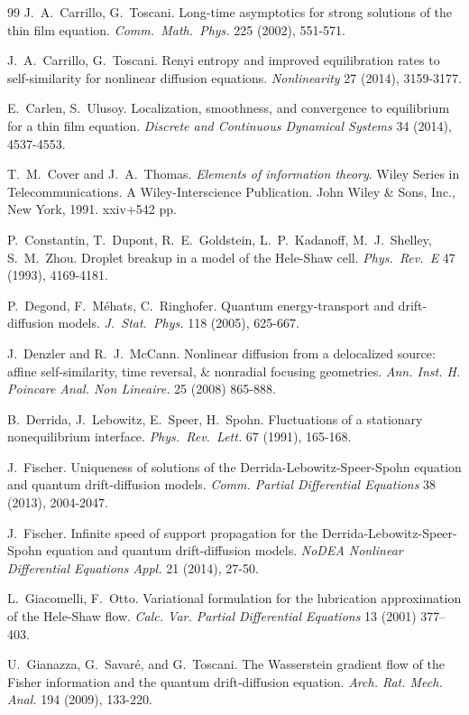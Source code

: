 \documentclass[12pt]{amsart}
\theoremstyle{plain}
\theoremstyle{definition}
\theoremstyle{remark}
\begin{document}
\begin{thebibliography}{99}
 J.~A.~Carrillo, G.~Toscani. Long-time asymptotics for strong solutions of the thin film equation. {\em Comm.~Math.~Phys.} 225 (2002), 551-571.

 J.~A.~Carrillo, G.~Toscani. Renyi entropy and improved equilibration rates to self-similarity for nonlinear diffusion equations. {\em Nonlinearity} 27 (2014), 3159-3177.

 E.~Carlen, S.~Ulusoy. Localization, smoothness, and convergence to equilibrium for a thin film equation. {\em Discrete and Continuous Dynamical Systems} 34 (2014), 4537-4553.

 T.~M.~Cover and J.~A.~Thomas. {\em Elements of information theory}. Wiley Series in Telecommunications. A Wiley-Interscience Publication. John Wiley \& Sons, Inc., New York, 1991. xxiv+542 pp.

 P.~Constantin, T.~Dupont, R.~E.~Goldstein, L.~P.~Kadanoff, M.~J.~Shelley, S.~M.~Zhou. Droplet breakup in a model of the Hele-Shaw cell. {\em Phys.~Rev.~E} 47 (1993), 4169-4181.

 P.~Degond, F.~M\'ehats, C.~Ringhofer. Quantum energy-transport and drift-diffusion models. {\em J.~Stat.~Phys.} 118 (2005), 625-667. 

 J.~Denzler and R.~J.~McCann. Nonlinear diffusion from a delocalized source: affine self-similarity, time reversal, \& nonradial focusing geometries. {\em Ann. Inst. H. Poincare Anal. Non Lineaire.} 25 (2008) 865-888.

 B.~Derrida, J.~Lebowitz, E.~Speer, H.~Spohn. Fluctuations of a stationary nonequilibrium interface. {\em Phys.~Rev.~Lett.} 67 (1991), 165-168.

J.~Fischer. Uniqueness of solutions of the Derrida-Lebowitz-Speer-Spohn equation and quantum drift-diffusion models.
{\em Comm. Partial Differential Equations} 38 (2013), 2004-2047.

J.~Fischer. Infinite speed of support propagation for the Derrida-Lebowitz-Speer-Spohn equation and quantum drift-diffusion models. {\em NoDEA Nonlinear Differential Equations Appl.} 21 (2014), 27-50.

L.~Giacomelli, F.~Otto. Variational formulation for the lubrication approximation of the Hele-Shaw flow. {\em Calc. Var. Partial Differential Equations} 13 (2001) 377–403.

 U.~Gianazza, G.~Savar\'e, and G.~Toscani. The Wasserstein gradient flow of the Fisher information and the quantum drift-diffusion equation. {\em Arch. Rat. Mech. Anal.} 194 (2009), 133-220.


\end{thebibliography}
\end{document}
